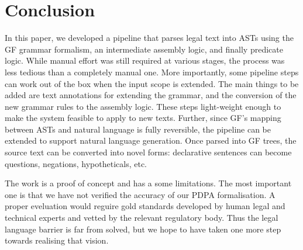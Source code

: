 \documentclass{IOS-Book-Article}
\newcommand{\todoj}[1]{{\color{red}\textbf{[J: #1]}}}
\begin{document}
\section{Conclusion}
\label{sec:discussion}
In this paper, we developed a pipeline that parses legal text into ASTs using the GF grammar formalism, an intermediate assembly logic, and finally predicate logic. %
While manual effort was still required at various stages, the process was less tedious than a completely manual one.
More importantly, some pipeline steps can work out of the box when the input scope is extended.
The main things to be added are text annotations for extending the grammar, and the conversion of the new grammar rules to the assembly logic.
These steps light-weight enough to make the system feasible to apply to new texts.
Further, since GF's mapping between ASTs and natural language is fully reversible, the pipeline can be extended to support natural language generation. Once parsed into GF trees, the source text can be converted into novel forms: declarative sentences can become questions, negations, hypotheticals, etc. 

The work is a proof of concept and has a some limitations.
The most important one is that we have not verified the accuracy of our PDPA formalisation.
A proper eveluation would reguire gold standards developed by human legal and technical experts and vetted by the relevant regulatory body.
Thus the legal language barrier is far from solved, but we hope to have taken one more step towards realising that vision.







\end{document}
